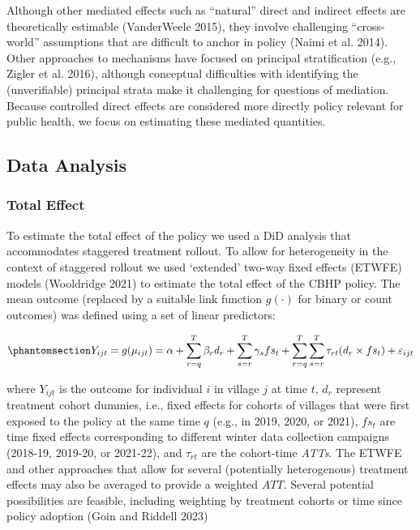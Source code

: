 \documentclass[
  letterpaper,
  DIV=11,
  numbers=noendperiod]{scrartcl}
\begin{document}
Although other mediated effects such as ``natural'' direct and indirect
effects are theoretically estimable (VanderWeele 2015), they involve
challenging ``cross-world'' assumptions that are difficult to anchor in
policy (Naimi et al. 2014). Other approaches to mechanisms have focused
on principal stratification (e.g., Zigler et al. 2016), although
conceptual difficulties with identifying the (unverifiable) principal
strata make it challenging for questions of mediation. Because
controlled direct effects are considered more directly policy relevant
for public health, we focus on estimating these mediated quantities.

\subsection{Data Analysis}\label{data-analysis}

\subsubsection{Total Effect}\label{total-effect}

To estimate the total effect of the policy we used a DiD analysis that
accommodates staggered treatment rollout. To allow for heterogeneity in
the context of staggered rollout we used `extended' two-way fixed
effects (ETWFE) models (Wooldridge 2021) to estimate the total effect of
the CBHP policy. The mean outcome (replaced by a suitable link function
\(g(\cdot)\) for binary or count outcomes) was defined using a set of
linear predictors:

\begin{equation}\phantomsection\label{eq-etwfe}{Y_{ijt}=g(\mu_{ijt}) = \alpha + \sum_{r=q}^{T} \beta_{r} d_{r} + \sum_{s=r}^{T} \gamma_{s} fs_{t}+ \sum_{r=q}^{T} \sum_{s=r}^{T} \tau_{rt} (d_{r} \times fs_{t}) + \varepsilon_{ijt}}\end{equation}

where \(Y_{ijt}\) is the outcome for individual \(i\) in village \(j\)
at time \(t\), \(d_{r}\) represent treatment cohort dummies, i.e., fixed
effects for cohorts of villages that were first exposed to the policy at
the same time \(q\) (e.g., in 2019, 2020, or 2021), \(fs_{t}\) are time
fixed effects corresponding to different winter data collection
campaigns (2018-19, 2019-20, or 2021-22), and \(\tau_{rt}\) are the
cohort-time \emph{ATTs}. The ETWFE and other approaches that allow for
several (potentially heterogenous) treatment effects may also be
averaged to provide a weighted \(ATT\). Several potential possibilities
are feasible, including weighting by treatment cohorts or time since
policy adoption (Goin and Riddell 2023)
\end{document}
